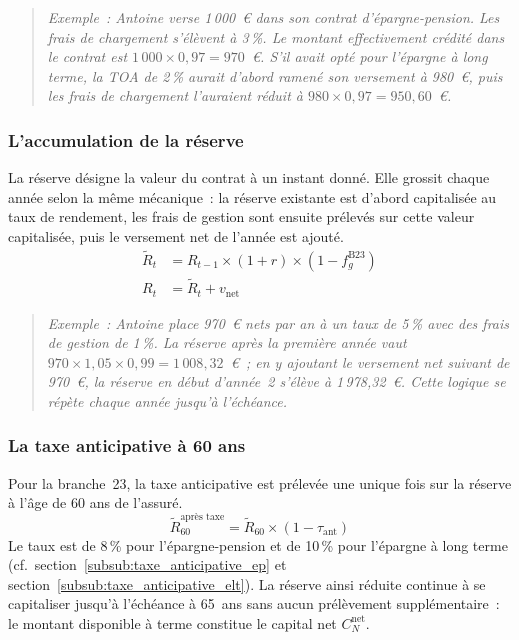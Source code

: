 ﻿\documentclass[12pt, a4paper]{article}
\begin{document}
\begin{quote}
\textit{Exemple~: Antoine verse 1\,000~€ dans son contrat d'épargne-pension.
Les frais de chargement s'élèvent à 3\,\%. Le montant effectivement crédité
dans le contrat est $1\,000 \times 0{,}97 = 970$~€. S'il avait opté pour
l'épargne à long terme, la TOA de 2\,\% aurait d'abord ramené son versement
à 980~€, puis les frais de chargement l'auraient réduit à
$980 \times 0{,}97 = 950{,}60$~€.}
\end{quote}

\subsubsection*{L'accumulation de la réserve}
\label{sub:accumulation_b23}

La réserve désigne la valeur du contrat à un instant donné. Elle grossit
chaque année selon la même mécanique~: la réserve existante est d'abord
capitalisée au taux de rendement, les frais de gestion sont ensuite prélevés
sur cette valeur capitalisée, puis le versement net de l'année est ajouté.
\begin{align}
  \widetilde{R}_t &= R_{t-1} \times (1 + r) \times (1 - f_g^{\text{B23}}) \\
  R_t             &= \widetilde{R}_t + v_{\text{net}}
\end{align}

\begin{quote}
\textit{Exemple~: Antoine place 970~€ nets par an à un taux de 5\,\% avec
des frais de gestion de 1\,\%. La réserve après la première année vaut
$970 \times 1{,}05 \times 0{,}99 = 1\,008{,}32$~€~; en y ajoutant le versement
net suivant de 970~€, la réserve en début d'année~2 s'élève à
1\,978{,}32~€. Cette logique se répète chaque année jusqu'à l'échéance.}
\end{quote}

\subsubsection*{La taxe anticipative à 60 ans}
\label{sub:taxe_anticipative_b23}

Pour la branche~23, la taxe anticipative est
prélevée une unique fois sur la réserve à l'âge de 60 ans de l'assuré.
\begin{equation}
  \widetilde{R}_{60}^{\text{après taxe}} = \widetilde{R}_{60} \times (1 - \tau_{\text{ant}})
\end{equation}
Le taux est de 8\,\% pour l'épargne-pension et de 10\,\% pour l'épargne à
long terme (cf.~section~\ref{subsub:taxe_anticipative_ep} et
section~\ref{subsub:taxe_anticipative_elt}). La réserve ainsi réduite continue à se capitaliser jusqu'à
l'échéance à 65~ans sans aucun prélèvement supplémentaire~: le montant
disponible à terme constitue le capital net $C_N^{\text{net}}$.
\end{document}
